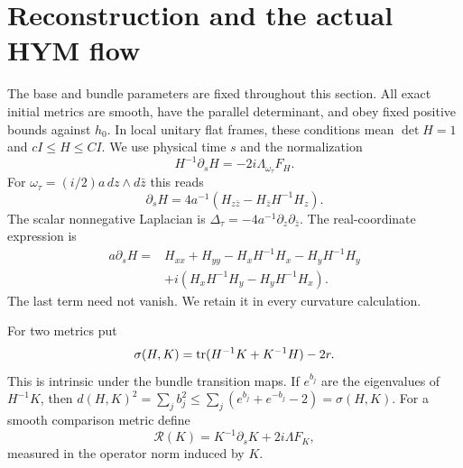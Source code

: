 \section{Reconstruction and the actual HYM flow}\label{sec:actual-flow}

The base and bundle parameters are fixed throughout
this section. All exact initial metrics are smooth,
have the parallel determinant, and obey fixed positive
bounds against $h_0$. In local unitary flat frames,
these conditions mean $\det H=1$ and $cI\le H\le CI$.
We use physical time $s$ and the normalization
\begin{equation}\label{eq:hym}
 H^{-1}\partial_sH=-2i\Lambda_{\omega_\tau}F_H.
\end{equation}
For $\omega_\tau=(i/2)a\,dz\wedge d\bar z$ this reads
\begin{equation}\label{eq:local-hym}
 \partial_sH=4a^{-1}
     (H_{z\bar z}-H_{\bar z}H^{-1}H_z).
\end{equation}
The scalar nonnegative Laplacian is
$\Delta_\tau=-4a^{-1}\partial_z\partial_{\bar z}$.
The real-coordinate expression is
\begin{equation}\label{eq:real-hym}
 \begin{split}
 a\partial_sH={}&H_{xx}+H_{yy}-H_xH^{-1}H_x-H_yH^{-1}H_y\\
 &+i(H_xH^{-1}H_y-H_yH^{-1}H_x).
 \end{split}
\end{equation}
The last term need not vanish. We retain it in every
curvature calculation.

For two metrics put
\[
 \sigma(H,K)=\operatorname{tr}(H^{-1}K+K^{-1}H)-2r.
\]
This is intrinsic under the bundle transition maps.
If $e^{b_j}$ are the eigenvalues of $H^{-1}K$, then
$d(H,K)^2=\sum_jb_j^2\le
\sum_j(e^{b_j}+e^{-b_j}-2)=\sigma(H,K)$.
For a smooth comparison metric define
\begin{equation}\label{eq:residual}
 \mathcal R(K)=K^{-1}\partial_sK+2i\Lambda F_K,
\end{equation}
measured in the operator norm induced by $K$.


